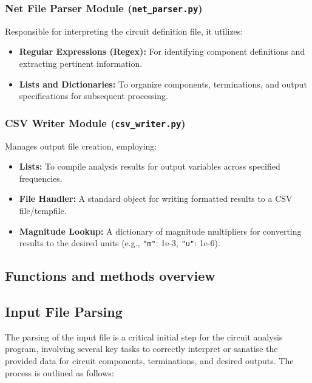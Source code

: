 \documentclass[a4paper]{article}
\begin{document}
\subsubsection*{Net File Parser Module (\texttt{net\_parser.py})}
Responsible for interpreting the circuit definition file, it utilizes:
\begin{itemize}
    \item \textbf{Regular Expressions (Regex):} For identifying component definitions and extracting pertinent information.
    \item \textbf{Lists and Dictionaries:} To organize components, terminations, and output specifications for subsequent processing.
\end{itemize}

\subsubsection*{CSV Writer Module (\texttt{csv\_writer.py})}
Manages output file creation, employing:
\begin{itemize}
    \item \textbf{Lists:} To compile analysis results for output variables across specified frequencies.
    \item \textbf{File Handler:} A standard object for writing formatted results to a CSV file/tempfile.
    \item \textbf{Magnitude Lookup:} A dictionary of magnitude multipliers for converting results to the desired units (e.g., \texttt{"m"}: 1e-3, \texttt{"u"}: 1e-6).
\end{itemize}

\subsection{Functions and methods overview}

\subsection*{Input File Parsing}
The parsing of the input file is a critical initial step for the circuit analysis program,
 involving several key tasks to correctly interpret or sanatise the provided data for circuit components,
  terminations, and desired outputs. The process is outlined as follows:
\end{document}
